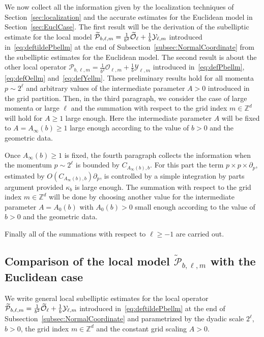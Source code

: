 \documentclass[10pt]{amsart}
\theoremstyle{definition}\newtheorem{defi}[theo]{Definition}\newtheorem{rema}[theo]{Remark}\newtheorem{exam}[theo]{Example}\newtheorem{exem}[theo]{Example}\newtheorem{nota}[theo]{Notation}
\newcommand{\Z}{\mathbb{Z}}
\newcommand{\clY}{\mathcal{Y}}
\newcommand{\clO}{\mathcal{O}}
\newcommand{\clP}{\mathcal{P}}
\let\oldtilde\tilde
\renewcommand*{\tilde}[1]{\mathchoice{\widetilde{#1}}{\widetilde{#1}}{\oldtilde{#1}}{\oldtilde{#1}}}
\begin{document}
We now collect all the information given by the localization techniques of Section~\ref{sec:localization} and the accurate estimates for the Euclidean model in Section~\ref{sec:EuclCase}. The first result will be the derivation of the subelliptic estimate for the local model $\tilde{\clP}_{b,\ell,m}=\frac{1}{b^2}\tilde{\clO}_{\ell}+\frac{1}{b}\clY_{\ell,m}$ introduced in~\eqref{eq:deftildePbellm} at the end of Subsection~\ref{subsec:NormalCoordinate} from the subelliptic estimates for the Euclidean model. The second result is about the other local operator $\clP_{b,\ell,m}=\frac{1}{b^2}\clO_{\ell,m}+\frac{1}{b}\clY_{\ell,m}$ introduced in~\eqref{eq:defPbellm}, \eqref{eq:defOellm} and~\eqref{eq:defYellm}. These preliminary results hold for all momenta $p\sim 2^{\ell}$ and arbitrary values of the intermediate parameter $A>0$ introduced in the grid partition. Then, in the third paragraph, we consider the case of large momenta or large $\ell$ and the summation with respect to the grid index $m\in\Z^d$ will hold for $A\geq 1$ large enough. Here the intermediate parameter $A$ will be fixed to $A=A_{\infty}(b)\geq 1$ large enough according to the value of $b>0$ and the geometric data.

Once $A_\infty(b)\geq 1$ is fixed, the fourth paragraph collects the information when the momentum $p\sim 2^{\ell}$ is bounded by $C_{A_\infty(b),b}$. For this part the term $p\times p\times \partial_p$, estimated by $O(C_{A_\infty(b),b})\partial_p$, is controlled by a simple integration by parts argument provided $\kappa_b$ is large enough. The summation with respect to the grid index $m\in\Z^d$ will be done by choosing another value for the intermediate parameter $A=A_0(b)$ with $A_0(b)>0$ small enough according to the value of $b>0$ and the geometric data.

Finally all of the summations with respect to $\ell\geq -1$ are carried out.

\subsection{Comparison of the local model \texorpdfstring{$\widetilde{\clP}_{b,\ell,m}$}{P\_b,l,m} with the Euclidean case}\label{sec:localtPbellm}

We write general local subelliptic estimates for the local operator $\tilde{\clP}_{b,\ell,m}=\frac{1}{b^2}\tilde{\clO}_{\ell}+\frac{1}{b}\clY_{\ell,m}$ introduced in~\eqref{eq:deftildePbellm} at the end of Subsection~\ref{subsec:NormalCoordinate} and parametrized by the dyadic scale $2^{\ell}$, $b>0$, the grid index $m\in \Z^d$ and the constant grid scaling $A>0$.
\end{document}
